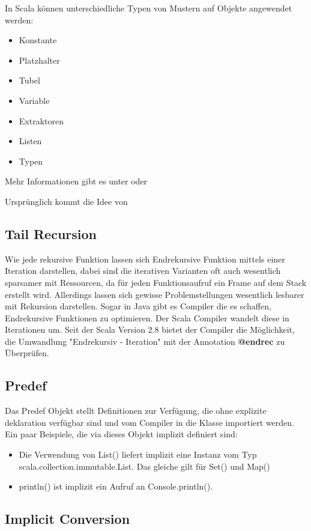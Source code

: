 In Scala k\"onnen unterschiedliche Typen von Mustern auf Objekte angewendet werden:
\begin{itemize}
	\item Konstante
	\item Platzhalter
	\item Tubel
	\item Variable
	\item Extraktoren
	\item Listen
	\item Typen
\end{itemize}

Mehr Informationen gibt es unter \cite[p. 263-296]{odersky2008programming} oder \cite[p. 167-176]{Piepmeyer201006}

Urspr\"unglich kommt die Idee von

\subsection{Tail Recursion}
Wie jede rekursive Funktion lassen sich Endrekursive\cite{wiki:Endrekursion} Funktion mittels einer Iteration darstellen, dabei sind die iterativen Varianten oft auch wesentlich sparsamer mit Ressourcen, da für jeden Funktionsaufruf ein Frame auf dem Stack erstellt wird. Allerdings lassen sich gewisse Problemstellungen wesentlich lesbarer mit Rekursion darstellen. Sogar in Java gibt es Compiler die es schaffen, Endrekursive Funktionen zu optimieren. Der Scala Compiler wandelt diese in Iterationen um. Seit der Scala Version 2.8 bietet der Compiler die M\"oglichkeit, die  Umwandlung "Endrekursiv - Iteration" mit der Annotation \textbf{@endrec} zu \"Uberpr\"ufen.

\subsection{Predef}
Das Predef Objekt stellt Definitionen zur Verf\"ugung, die ohne explizite deklaration verf\"ugbar sind und vom Compiler in die Klasse importiert werden. Ein paar Beispiele, die via dieses Objekt implizit definiert sind: 
\begin{itemize}
	\item Die Verwendung von List() liefert implizit eine Instanz vom Typ scala.collection.immutable.List. Das gleiche gilt f\"ur Set() und Map()
	\item println() ist implizit ein Aufruf an Console.println().
\end{itemize}

\subsection{Implicit Conversion}

